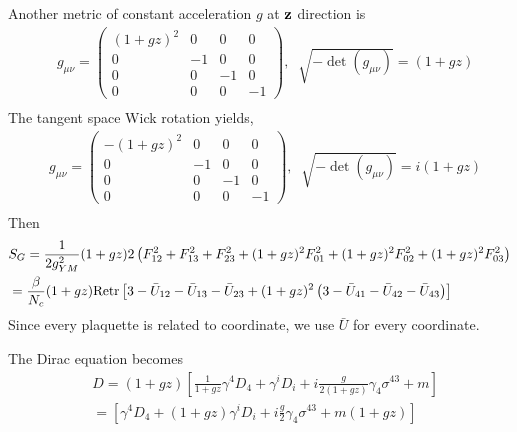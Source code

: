Another metric of constant acceleration $g$ at ${\bf z}$ direction is
\begin{equation}
\begin{split}
&g_{\mu\nu}=\left(\begin{array}{cccc} \left(1 + gz\right)^2 & 0 & 0 & 0 \\ 0 & -1 & 0 & 0 \\ 0 & 0 & -1 & 0 \\ 0 & 0 & 0 & -1 \end{array}\right),\;\;\sqrt{-\det (g_{\mu\nu})}=(1+gz)\\
\end{split}
\end{equation}
The tangent space Wick rotation yields, 
\begin{equation}
\begin{split}
&g_{\mu\nu}=\left(\begin{array}{cccc} -\left(1 + gz\right)^2 & 0 & 0 & 0 \\ 0 & -1 & 0 & 0 \\ 0 & 0 & -1 & 0 \\ 0 & 0 & 0 & -1 \end{array}\right),\;\;\sqrt{-\det (g_{\mu\nu})}=i(1+gz)\\
\end{split}
\end{equation}
Then
\begin{equation}
\begin{split}
&S_G=\frac{1}{2g_{YM}^2}(1+g z)2\left(F_{12}^2+F_{13}^2+F_{23}^2+(1+g z)^2F_{01}^2+(1+g z)^2F_{02}^2+(1+g z)^2F_{03}^2\right)\\
&=\frac{\beta}{N_c}(1+g z){\rm Retr}\left[3-\bar{U}_{12}-\bar{U}_{13}-\bar{U}_{23}+(1+g z)^2\left(3-\bar{U}_{41}-\bar{U}_{42}-\bar{U}_{43}\right)\right]\\
\end{split}
\end{equation}
Since every plaquette is related to coordinate, we use $\bar{U}$ for every coordinate.


The Dirac equation becomes
\begin{equation}
\begin{split}
&D=(1+gz)\left[\frac{1}{1+gz}\gamma ^4D_4+\gamma ^iD_i+i\frac{g}{2(1+gz)}\gamma _4 \sigma ^{43}+m\right]\\
&=\left[\gamma ^4D_4+(1+gz)\gamma ^iD_i+i\frac{g}{2}\gamma _4 \sigma ^{43}+m(1+gz)\right]\\
\end{split}
\end{equation}

